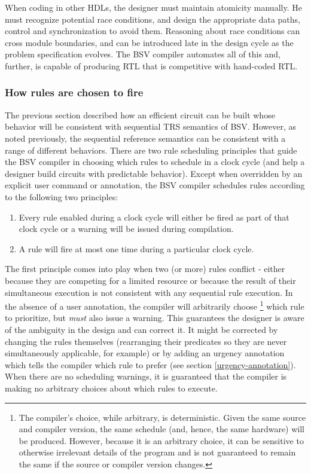 \documentclass[twoside,letterpaper]{article}
\newcommand{\BSV}{BSV}
\begin{document}
When coding in other HDLs, the designer must maintain atomicity
manually.  He must recognize potential race conditions, and design the
appropriate data paths, control and synchronization to avoid them.
Reasoning about race conditions can cross module boundaries, and can
be introduced late in the design cycle as the problem specification
evolves.  The {\BSV} compiler automates all of this and, further, is
capable of producing RTL that is competitive with hand-coded RTL.

\subsubsection{How rules are chosen to fire}
\label{rule-choice}
The previous section described how an efficient circuit can be built
whose behavior will be consistent with sequential TRS semantics of {\BSV}.
However, as noted previously, the sequential reference semantics can be 
consistent with a range of different behaviors. There are two rule 
scheduling principles that guide the {\BSV} compiler in choosing 
which rules to schedule in a clock cycle (and help a designer build
circuits with predictable behavior). Except when overridden by an 
explicit user command or annotation, the {\BSV} compiler schedules 
rules according to the following two principles:

\begin{enumerate} 
\item Every rule enabled during a clock cycle will either be fired as part of
that clock cycle or a warning will be issued during compilation.
\item A rule will fire at most one time during a particular clock cycle.
\end{enumerate}

The first principle comes into play when two (or more) rules conflict - 
either because they are competing for a limited resource or because the result 
of their simultaneous execution is not consistent with any sequential rule 
execution. In the absence of a user annotation, the compiler will arbitrarily 
choose \footnote{The compiler's choice, while arbitrary, is deterministic. 
Given the same source and compiler version, the same schedule 
(and, hence, the same hardware) will be produced. However, because 
it is an arbitrary choice, it can be sensitive to otherwise irrelevant 
details of the program and is not guaranteed to remain the same if the 
source or compiler version changes.} 
which rule to prioritize, but \emph{must} also issue a warning. This guarantees 
the designer is aware of the ambiguity in the design and can correct it. It
might be corrected by changing the rules themselves (rearranging their predicates 
so they are never simultaneously applicable, for example) or by adding an urgency 
annotation which tells the compiler which rule to prefer (see section 
\ref{urgency-annotation}). When there are no scheduling warnings, it is 
guaranteed that the compiler is making no arbitrary choices about which rules to
execute.
\end{document}

